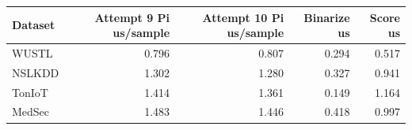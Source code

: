 \begin{tabular}{lrrrr}
\toprule
Dataset & Attempt 9 Pi us/sample & Attempt 10 Pi us/sample & Binarize us & Score us \\
\midrule
WUSTL & 0.796 & 0.807 & 0.294 & 0.517 \\
NSLKDD & 1.302 & 1.280 & 0.327 & 0.941 \\
TonIoT & 1.414 & 1.361 & 0.149 & 1.164 \\
MedSec & 1.483 & 1.446 & 0.418 & 0.997 \\
\bottomrule
\end{tabular}
